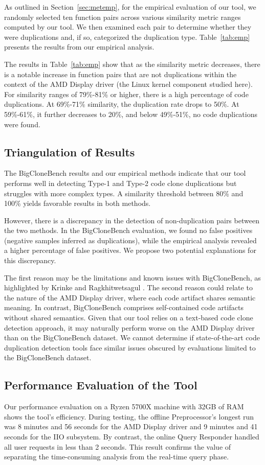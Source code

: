 As outlined in Section~\ref{sec:metemp}, for the empirical evaluation of our tool, we randomly selected ten function pairs across various similarity metric ranges computed by our tool. We then examined each pair to determine whether they were duplications and, if so, categorized the duplication type. Table~\ref{tab:emp} presents the results from our empirical analysis.



The results in Table~\ref{tab:emp} show that as the similarity metric decreases, 
there is a notable increase in function pairs that are not duplications within 
the context of the AMD Display driver (the Linux kernel component studied here). 
For similarity ranges of 79\%-81\% or higher, there is a high 
percentage of code duplications. At 69\%-71\% similarity, the duplication rate 
drops to 50\%. At 59\%-61\%, it further decreases to 20\%, and below 49\%-51\%, 
no code duplications were found.

\subsection{Triangulation of Results}

The BigCloneBench results and our empirical methods indicate that our tool performs well in detecting Type-1 and Type-2 code clone duplications but struggles with more complex types. A similarity threshold between 80\% and 100\% yields favorable results in both methods.

However, there is a discrepancy in the detection of non-duplication pairs between the two methods. In the BigCloneBench evaluation, we found no false positives (negative samples inferred as duplications), while the empirical analysis revealed a higher percentage of false positives. We propose two potential explanations for this discrepancy.

The first reason may be the limitations and known issues with BigCloneBench, as highlighted by Krinke and Ragkhitwetsagul \citep{bigfail}. The second reason could relate to the nature of the AMD Display driver, where each code artifact shares semantic meaning. In contrast, BigCloneBench comprises self-contained code artifacts without shared semantics. Given that our tool relies on a text-based code clone detection approach, it may naturally perform worse on the AMD Display driver than on the BigCloneBench dataset. We cannot determine if state-of-the-art code duplication detection tools face similar issues obscured by evaluations limited to the BigCloneBench dataset.

\subsection{Performance Evaluation of the Tool}

Our performance evaluation on a Ryzen 5700X machine with 32GB of RAM shows the tool's efficiency. 
During testing, the offline Preprocessor's longest run was 8 minutes and 56 seconds for the AMD Display driver 
and 9 minutes and 41 seconds for the IIO subsystem. By contrast, the online Query Responder handled all user
requests in less than 2 seconds. This result confirms the value of separating the time-consuming analysis 
from the real-time query phase.
